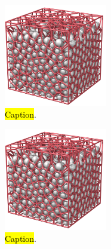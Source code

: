 %
\begin{figure}[htpb]%
\centering%
\includegraphics[width=0.4\textwidth]{images/voronoi/import_AM2_A001.png}%
\caption{%
    \hl{Caption}. %
}%
\end{figure}%
%
\begin{figure}[htpb]%
\centering%
\includegraphics[width=0.4\textwidth]{images/voronoi/import_AM2_A001.png}%
\caption{%
    \hl{Caption}. %
}%
\end{figure}%

